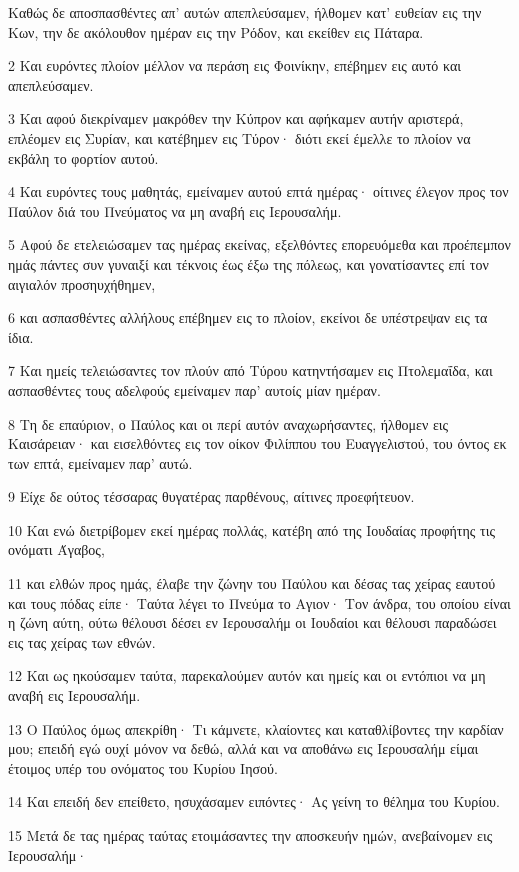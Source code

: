 \par Καθώς δε αποσπασθέντες απ' αυτών απεπλεύσαμεν, ήλθομεν κατ' ευθείαν εις την Κων, την δε ακόλουθον ημέραν εις την Ρόδον, και εκείθεν εις Πάταρα.
\par 2 Και ευρόντες πλοίον μέλλον να περάση εις Φοινίκην, επέβημεν εις αυτό και απεπλεύσαμεν.
\par 3 Και αφού διεκρίναμεν μακρόθεν την Κύπρον και αφήκαμεν αυτήν αριστερά, επλέομεν εις Συρίαν, και κατέβημεν εις Τύρον· διότι εκεί έμελλε το πλοίον να εκβάλη το φορτίον αυτού.
\par 4 Και ευρόντες τους μαθητάς, εμείναμεν αυτού επτά ημέρας· οίτινες έλεγον προς τον Παύλον διά του Πνεύματος να μη αναβή εις Ιερουσαλήμ.
\par 5 Αφού δε ετελειώσαμεν τας ημέρας εκείνας, εξελθόντες επορευόμεθα και προέπεμπον ημάς πάντες συν γυναιξί και τέκνοις έως έξω της πόλεως, και γονατίσαντες επί τον αιγιαλόν προσηυχήθημεν,
\par 6 και ασπασθέντες αλλήλους επέβημεν εις το πλοίον, εκείνοι δε υπέστρεψαν εις τα ίδια.
\par 7 Και ημείς τελειώσαντες τον πλούν από Τύρου κατηντήσαμεν εις Πτολεμαΐδα, και ασπασθέντες τους αδελφούς εμείναμεν παρ' αυτοίς μίαν ημέραν.
\par 8 Τη δε επαύριον, ο Παύλος και οι περί αυτόν αναχωρήσαντες, ήλθομεν εις Καισάρειαν· και εισελθόντες εις τον οίκον Φιλίππου του Ευαγγελιστού, του όντος εκ των επτά, εμείναμεν παρ' αυτώ.
\par 9 Είχε δε ούτος τέσσαρας θυγατέρας παρθένους, αίτινες προεφήτευον.
\par 10 Και ενώ διετρίβομεν εκεί ημέρας πολλάς, κατέβη από της Ιουδαίας προφήτης τις ονόματι Άγαβος,
\par 11 και ελθών προς ημάς, έλαβε την ζώνην του Παύλου και δέσας τας χείρας εαυτού και τους πόδας είπε· Ταύτα λέγει το Πνεύμα το Αγιον· Τον άνδρα, του οποίου είναι η ζώνη αύτη, ούτω θέλουσι δέσει εν Ιερουσαλήμ οι Ιουδαίοι και θέλουσι παραδώσει εις τας χείρας των εθνών.
\par 12 Και ως ηκούσαμεν ταύτα, παρεκαλούμεν αυτόν και ημείς και οι εντόπιοι να μη αναβή εις Ιερουσαλήμ.
\par 13 Ο Παύλος όμως απεκρίθη· Τι κάμνετε, κλαίοντες και καταθλίβοντες την καρδίαν μου; επειδή εγώ ουχί μόνον να δεθώ, αλλά και να αποθάνω εις Ιερουσαλήμ είμαι έτοιμος υπέρ του ονόματος του Κυρίου Ιησού.
\par 14 Και επειδή δεν επείθετο, ησυχάσαμεν ειπόντες· Ας γείνη το θέλημα του Κυρίου.
\par 15 Μετά δε τας ημέρας ταύτας ετοιμάσαντες την αποσκευήν ημών, ανεβαίνομεν εις Ιερουσαλήμ·
